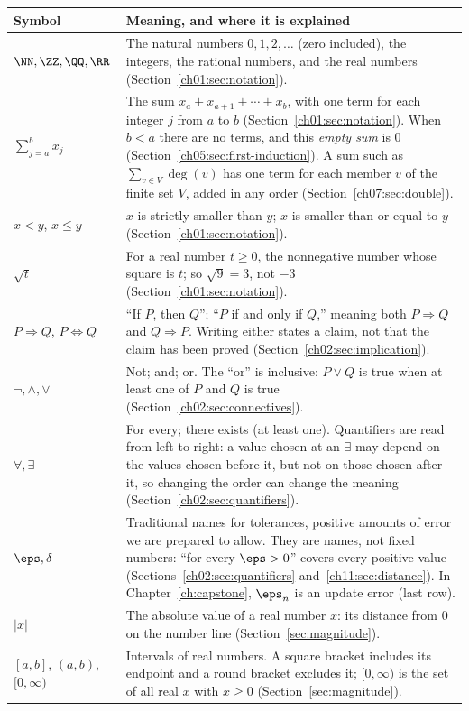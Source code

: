 \begin{longtable}{@{}p{1.25in}p{3.95in}@{}}
\toprule Symbol & Meaning, and where it is explained\\\midrule\endhead
$\NN,\ZZ,\QQ,\RR$ & The natural numbers $0,1,2,\ldots$ (zero included), the integers, the rational numbers, and the real numbers (Section~\ref{ch01:sec:notation}).\\
$\sum_{j=a}^{b}x_j$ & The sum $x_a+x_{a+1}+\cdots+x_b$, with one term for each integer $j$ from $a$ to $b$ (Section~\ref{ch01:sec:notation}). When $b<a$ there are no terms, and this \emph{empty sum} is $0$ (Section~\ref{ch05:sec:first-induction}). A sum such as $\sum_{v\in V}\deg(v)$ has one term for each member $v$ of the finite set $V$, added in any order (Section~\ref{ch07:sec:double}).\\
$x<y$, $x\le y$ & $x$ is strictly smaller than $y$; $x$ is smaller than or equal to $y$ (Section~\ref{ch01:sec:notation}).\\
$\sqrt t$ & For a real number $t\ge0$, the nonnegative number whose square is $t$; so $\sqrt9=3$, not $-3$ (Section~\ref{ch01:sec:notation}).\\
$P\Rightarrow Q$, $P\Leftrightarrow Q$ & ``If $P$, then $Q$''; ``$P$ if and only if $Q$,'' meaning both $P\Rightarrow Q$ and $Q\Rightarrow P$. Writing either states a claim, not that the claim has been proved (Section~\ref{ch02:sec:implication}).\\
$\neg,\land,\lor$ & Not; and; or. The ``or'' is inclusive: $P\lor Q$ is true when at least one of $P$ and $Q$ is true (Section~\ref{ch02:sec:connectives}).\\
$\forall,\exists$ & For every; there exists (at least one). Quantifiers are read from left to right: a value chosen at an $\exists$ may depend on the values chosen before it, but not on those chosen after it, so changing the order can change the meaning (Section~\ref{ch02:sec:quantifiers}).\\
$\eps,\delta$ & Traditional names for tolerances, positive amounts of error we are prepared to allow. They are names, not fixed numbers: ``for every $\eps>0$'' covers every positive value (Sections~\ref{ch02:sec:quantifiers} and~\ref{ch11:sec:distance}). In Chapter~\ref{ch:capstone}, $\eps_n$ is an update error (last row).\\
$|x|$ & The absolute value of a real number $x$: its distance from $0$ on the number line (Section~\ref{sec:magnitude}).\\
$[a,b]$, $(a,b)$, $[0,\infty)$ & Intervals of real numbers. A square bracket includes its endpoint and a round bracket excludes it; $[0,\infty)$ is the set of all real $x$ with $x\ge0$ (Section~\ref{sec:magnitude}).\\

\end{longtable}
